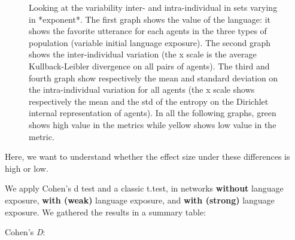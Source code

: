 \documentclass[
]{article}
\begin{document}
\begin{figure}[!H]
\caption{Looking at the variability inter- and intra-individual in sets varying in *exponent*. The first graph shows the value of the language: it shows the favorite utterance for each agents in the three types of population (variable initial language exposure). The second graph shows the  inter-individual variation (the x scale is the average Kullback-Leibler divergence on all pairs of agents). The third and fourth graph show respectively the mean and standard deviation on the intra-individual variation for all agents (the x scale shows respectively the mean and the std of the entropy on the Dirichlet internal representation of agents). In all the following graphs, green shows high value in the metrics while yellow shows low value in the metric.}\label{fig:unnamed-chunk-14}
\end{figure}

Here, we want to understand whether the effect size under these
differences is high or low.

We apply Cohen's d test and a classic t.test, in networks
\textbf{without} language exposure, \textbf{with (weak)} language
exposure, and \textbf{with (strong)} language exposure. We gathered the
results in a summary table:

Cohen's \emph{D}:
\end{document}
